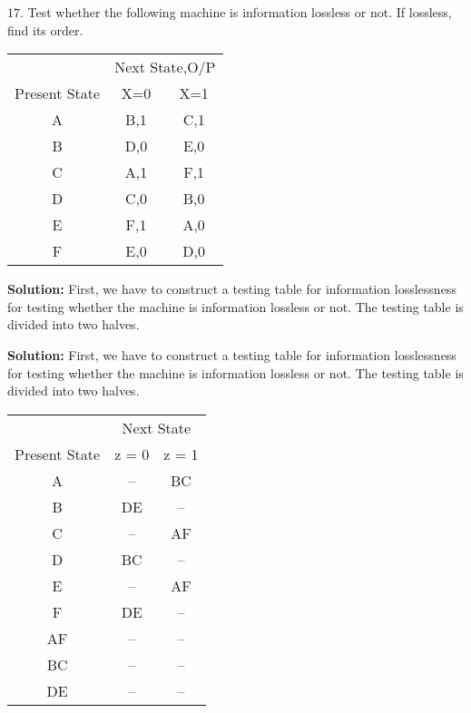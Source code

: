 \documentclass{article}
\begin{document}
$17.$ Test whether the following machine is information lossless or not. If lossless, find its order.

\vspace*{0.1cm}
\begin{center}
\begin{tabular}{ccc}
 \hline

 \hline

 \hline

 \hline
 & \multicolumn{2}{c}{Next State,O/P}\\
 \cline{2-3}
Present State & X=0           &   X=1\\
\hline
    A    &  B,1  & C,1 \\
    B    &  D,0  & E,0 \\
    C    &  A,1  & F,1 \\
    D    &  C,0  & B,0 \\
    E    &  F,1  & A,0 \\
    F    &  E,0  & D,0 \\
 \hline

 \hline

 \hline

 \hline
\end{tabular}
\end{center}

\large{\textbf{Solution:}} \small{First, we have to construct a testing table for information losslessness for testing whether the machine is information lossless or not. The testing table is divided into two halves.}

\large{\textbf{Solution:}} First, we have to construct a testing table for information losslessness for testing whether the machine is information lossless or not. The testing table is divided into two halves.

\begin{center}
  \begin{tabular}{ccc}
\hline

\hline

\hline

\hline
 & \multicolumn{2}{c}{Next State}\\
 \cline{2-3}
Present State & z = 0 & z = 1\\
\hline
 A &     --    &     BC     \\
 B &     DE    &     --     \\
 C &     --    &     AF     \\
 D &     BC    &     --     \\
 E &     --    &     AF     \\
 F &     DE    &     --     \\
\hline
 AF &    --      &     --  \\
 BC &    --      &     --  \\
 DE &    --      &     --  \\
\hline

\hline

\hline

\hline

  \end{tabular}
\end{center}
\end{document}
